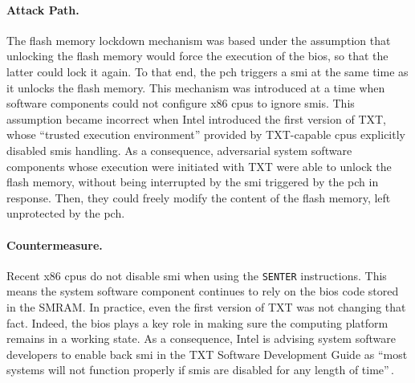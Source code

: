 \paragraph{Attack Path.}
%
The flash memory lockdown mechanism was based under the assumption that
unlocking the flash memory would force the execution of the \ac{bios}, so that
the latter could lock it again.
%
To that end, the \ac{pch} triggers a \ac{smi} at the same time as it unlocks the
flash memory.
%
This mechanism was introduced at a time when software components could not
configure x86 \acp{cpu} to ignore \acp{smi}.
%
This assumption became incorrect when Intel introduced the first version of TXT,
whose ``trusted execution environment'' provided by TXT-capable \acp{cpu}
explicitly disabled \acp{smi} handling.
%
As a consequence, adversarial system software components whose execution were
initiated with TXT were able to unlock the flash memory, without being
interrupted by the \ac{smi} triggered by the \ac{pch} in response.
%
Then, they could freely modify the content of the flash memory, left unprotected
by the \ac{pch}.
 

\paragraph{Countermeasure.}
%
Recent x86 \acp{cpu} do not disable \ac{smi} when using the \texttt{SENTER}
instructions.
%
This means the system software component continues to rely on the \ac{bios} code
stored in the SMRAM.
%
In practice, even the first version of TXT was not changing that fact.
%
Indeed, the \ac{bios} plays a key role in making sure the computing platform
remains in a working state.
%
As a consequence, Intel is advising system software developers to enable back
\ac{smi} in the TXT Software Development Guide as ``most systems will not
function properly if \acp{smi} are disabled for any length of
time''\,\cite{intel2015txt}.

